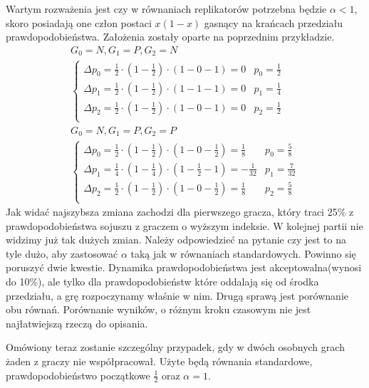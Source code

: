 Wartym rozważenia jest czy w równaniach replikatorów potrzebna będzie $\alpha < 1$, skoro posiadają one człon postaci $x(1-x)$ gasnący na krańcach przedziału prawdopodobieństwa. Założenia zostały oparte na poprzednim przykładzie.
\begin{gather*}
G_0 = N, G_1 = P, G_2 = N \\
\left\{
\begin{array}{ll}
\Delta p_0 = \frac{1}{2} \cdot (1 - \frac{1}{2}) \cdot (1 - 0 - 1) =  0 & p_0=\frac{1}{2}\\
\Delta p_1 = \frac{1}{2} \cdot (1 - \frac{1}{2}) \cdot (1 - 1 - 1) =  0 & p_1= \frac{1}{4}\\
\Delta p_2 = \frac{1}{2} \cdot (1 - \frac{1}{2}) \cdot (1 - 0 - 1) =  0 & p_2=\frac{1}{2}\\
\end{array} 
\right.
\\
G_0 = N, G_1 = P, G_2 = P \\
\left\{
\begin{array}{ll}
\Delta p_0 = \frac{1}{2} \cdot (1 - \frac{1}{2}) \cdot (1 - 0 - \frac{1}{2}) = \frac{1}{8} & p_0=\frac{5}{8}\\
\Delta p_1 = \frac{1}{4} \cdot (1 - \frac{1}{4}) \cdot (1 - \frac{1}{2} - 1) = -\frac{1}{32} & p_1= \frac{7}{32}\\
\Delta p_2 = \frac{1}{2} \cdot (1 - \frac{1}{2}) \cdot (1 - 0 - \frac{1}{2}) = \frac{1}{8}  & p_2=\frac{5}{8}\\
\end{array}
\right.
\end{gather*}
Jak widać najszybsza zmiana zachodzi dla pierwszego gracza, który traci 25\% z prawdopodobieństwa sojuszu z graczem o wyższym indeksie. W kolejnej partii nie widzimy już tak dużych zmian. Należy odpowiedzieć na pytanie czy jest to na tyle dużo, aby zastosować $\alpha$ taką jak w równaniach standardowych. Powinno się poruszyć dwie kwestie. Dynamika prawdopodobieństwa jest akceptowalna(wynosi do 10\%), ale tylko dla prawdopodobieństw które oddalają się od środka przedziału, a grę rozpoczynamy właśnie w nim. Drugą sprawą jest porównanie obu równań. Porównanie wyników, o różnym kroku czasowym nie jest najłatwiejszą rzeczą do opisania.


Omówiony teraz zostanie szczególny przypadek, gdy w dwóch osobnych grach żaden z graczy nie współpracował. Użyte będą równania standardowe, prawdopodobieństwo początkowe $\frac{1}{2}$ oraz $\alpha = 1$.

